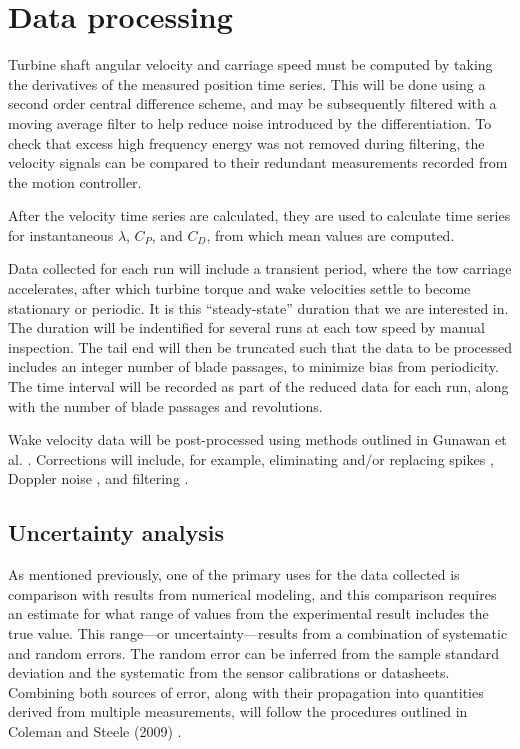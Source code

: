\documentclass[12pt,letterpaper]{scrreprt}
\begin{document}
\section{Data processing}

Turbine shaft angular velocity and carriage speed must be computed by taking the
derivatives of the measured position time series. This will be done using a
second order central difference scheme, and may be subsequently filtered with a
moving average filter to help reduce noise introduced by the differentiation. To
check that excess high frequency energy was not removed during filtering, the
velocity signals can be compared to their redundant measurements recorded from
the motion controller.

After the velocity time series are calculated, they are used to calculate time
series for instantaneous $\lambda$, $C_P$, and $C_D$, from which mean values are
computed.

Data collected for each run will include a transient period, where the tow
carriage accelerates, after which turbine torque and wake velocities settle to
become stationary or periodic. It is this ``steady-state'' duration that we are
interested in. The duration will be indentified for several runs at each tow
speed by manual inspection. The tail end will then be truncated such that the
data to be processed includes an integer number of blade passages, to minimize
bias from periodicity. The time interval will be recorded as part of the reduced
data for each run, along with the number of blade passages and revolutions.

Wake velocity data will be post-processed using methods outlined in Gunawan et
al. \cite{Gunawan2011}. Corrections will include, for example, eliminating
and/or replacing spikes \cite{Goring2002}, Doppler noise \cite{Voulgaris1998},
and filtering \cite{Garcia2005}.

\subsection{Uncertainty analysis}

As mentioned previously, one of the primary uses for the data collected is
comparison with results from numerical modeling, and this comparison requires an
estimate for what range of values from the experimental result includes the true
value. This range---or uncertainty---results from a combination of systematic
and random errors. The random error can be inferred from
the sample standard deviation and the systematic from the sensor calibrations or
datasheets. Combining both sources of error, along with their propagation into quantities derived from multiple measurements, will follow the procedures outlined in Coleman and Steele (2009) \cite{ColemanSteele}.
\end{document}
